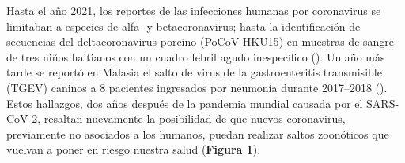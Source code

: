 Hasta el año 2021, los reportes de las infecciones humanas por coronavirus 
se limitaban a especies de alfa- y betacoronavirus; hasta la identificación 
de secuencias del deltacoronavirus porcino (PoCoV-HKU15) en muestras de 
sangre de tres niños haitianos con un cuadro febril agudo inespecífico 
(\cite{lednicky_independent_2021}). Un año más tarde se reportó en Malasia 
el salto de virus de la gastroenteritis transmisible (TGEV) caninos a 8 
pacientes ingresados por neumonía durante 2017--2018 
(\cite{vlasova_novel_2022}). Estos hallazgos, dos años después de la 
pandemia mundial causada por el SARS-CoV-2, resaltan nuevamente la 
posibilidad de que nuevos coronavirus, previamente no asociados a los 
humanos, puedan realizar saltos zoonóticos que vuelvan a poner en riesgo 
nuestra salud (\textbf{Figura 1}).

\newpage

